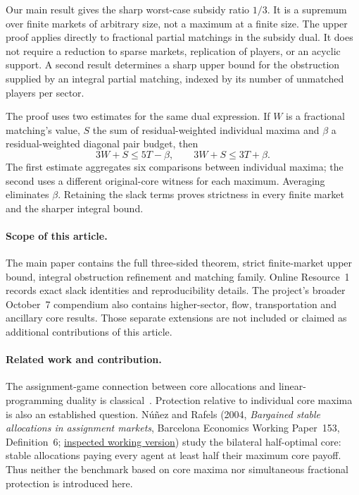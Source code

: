 \documentclass[11pt]{article}
\theoremstyle{remark}
\begin{document}
Our main result gives the sharp worst-case subsidy ratio $1/3$. It is a
supremum over finite markets of arbitrary size, not a maximum at a finite
size. The upper proof applies directly to fractional partial matchings in
the subsidy dual. It does not require a reduction to sparse markets,
replication of players, or an acyclic support. A second result determines a
sharp upper bound for the obstruction supplied by an integral partial
matching, indexed by its number of unmatched players per sector.

The proof uses two estimates for the same dual expression. If $W$ is a
fractional matching's value, $S$ the sum of residual-weighted individual
maxima and $\beta$ a residual-weighted diagonal pair budget, then
\[
                 3W+S\le5T-\beta,
        \qquad   3W+S\le3T+\beta.
\]
The first estimate aggregates six comparisons between individual maxima;
the second uses a different original-core witness for each maximum.
Averaging eliminates $\beta$. Retaining the slack terms proves strictness in
every finite market and the sharper integral bound.

\paragraph{Scope of this article.}
The main paper contains the full three-sided theorem, strict finite-market
upper bound, integral obstruction refinement and matching family. Online
Resource~1 records exact slack identities and reproducibility details.
The project's broader October~7 compendium also contains higher-sector,
flow, transportation and ancillary core results. Those separate extensions
are not included or claimed as additional contributions of this article.

\paragraph{Related work and contribution.}
The assignment-game connection between core allocations and linear-programming
duality is classical~\citep{ShapleyShubik1971}. Protection relative to individual
core maxima is also an established question. N\'u\~nez and Rafels (2004, \emph{Bargained stable allocations in assignment
markets}, Barcelona Economics Working Paper~153, Definition~6;
\href{https://www.bse.eu/sites/default/files/working_paper_pdfs/153.pdf}{inspected working version}) study the bilateral half-optimal core:
stable allocations paying every agent at least half their maximum core
payoff. Thus neither the benchmark based on core maxima nor simultaneous
fractional protection is introduced here.
\end{document}
